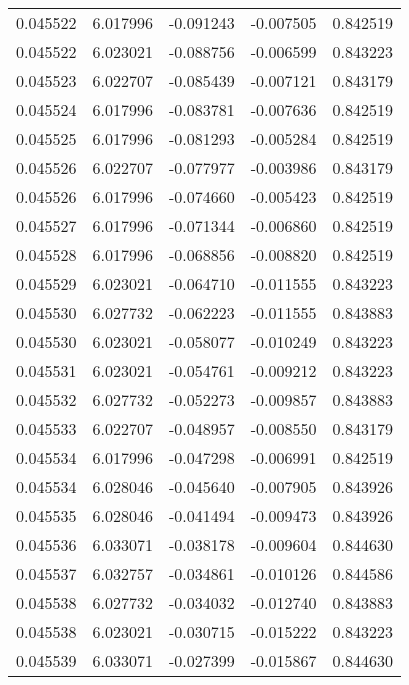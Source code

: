 \begin{tabular}{lrrrr}
0.045522    &  6.017996 & -0.091243 & -0.007505 &             0.842519 \\
0.045522    &  6.023021 & -0.088756 & -0.006599 &             0.843223 \\
0.045523    &  6.022707 & -0.085439 & -0.007121 &             0.843179 \\
0.045524    &  6.017996 & -0.083781 & -0.007636 &             0.842519 \\
0.045525    &  6.017996 & -0.081293 & -0.005284 &             0.842519 \\
0.045526    &  6.022707 & -0.077977 & -0.003986 &             0.843179 \\
0.045526    &  6.017996 & -0.074660 & -0.005423 &             0.842519 \\
0.045527    &  6.017996 & -0.071344 & -0.006860 &             0.842519 \\
0.045528    &  6.017996 & -0.068856 & -0.008820 &             0.842519 \\
0.045529    &  6.023021 & -0.064710 & -0.011555 &             0.843223 \\
0.045530    &  6.027732 & -0.062223 & -0.011555 &             0.843883 \\
0.045530    &  6.023021 & -0.058077 & -0.010249 &             0.843223 \\
0.045531    &  6.023021 & -0.054761 & -0.009212 &             0.843223 \\
0.045532    &  6.027732 & -0.052273 & -0.009857 &             0.843883 \\
0.045533    &  6.022707 & -0.048957 & -0.008550 &             0.843179 \\
0.045534    &  6.017996 & -0.047298 & -0.006991 &             0.842519 \\
0.045534    &  6.028046 & -0.045640 & -0.007905 &             0.843926 \\
0.045535    &  6.028046 & -0.041494 & -0.009473 &             0.843926 \\
0.045536    &  6.033071 & -0.038178 & -0.009604 &             0.844630 \\
0.045537    &  6.032757 & -0.034861 & -0.010126 &             0.844586 \\
0.045538    &  6.027732 & -0.034032 & -0.012740 &             0.843883 \\
0.045538    &  6.023021 & -0.030715 & -0.015222 &             0.843223 \\
0.045539    &  6.033071 & -0.027399 & -0.015867 &             0.844630 \\

\end{tabular}
